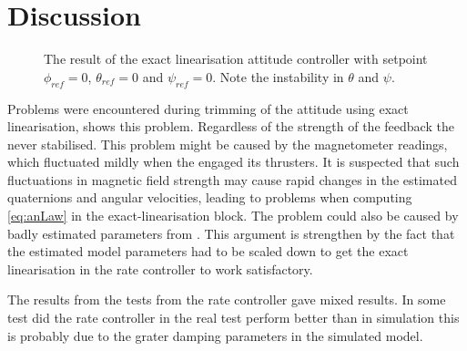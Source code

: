 \section{Discussion}
\begin{figure}
\centering
  \qquad
  \qquad
  \caption{\label{fig:ExactLinAttitude}%
  The result of the exact linearisation attitude controller with setpoint $\phi_{ref}=0$, $\theta_{ref}=0$ and $\psi_{ref}=0$. Note the instability in $\theta$ and $\psi$.}
\end{figure}

Problems were encountered during trimming of the attitude \abbrPID using exact linearisation,  shows this problem. Regardless of the strength of the feedback the \abbrROV never stabilised. This problem might be caused by the magnetometer readings, which fluctuated mildly when the \abbrROV  engaged its thrusters. It is suspected that such fluctuations in magnetic field strength may cause rapid changes in the estimated quaternions and angular velocities, leading to problems when computing \eqref{eq:anLaw} in the exact-linearisation block. The problem could also be caused by badly estimated parameters from . This argument is strengthen by the fact that the estimated model parameters had to be scaled down to get the exact linearisation in the rate controller to work satisfactory. 

The results from the tests from the rate controller gave mixed results. In some test did the rate controller in the real test perform better than in simulation this is probably due to the grater damping parameters in the simulated \abbrROV model. 

   